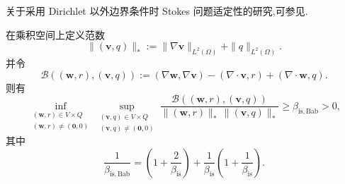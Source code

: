 \begin{note}[其他边界条件]\label{note:stokes-other-boundary-conditions}
关于采用 Dirichlet 以外边界条件时 Stokes 问题适定性的研究,可参见\textcite[第 4.1.4 节]{ErnGuermond2004}.
\end{note}

\begin{lemma}\label{lem:stokes-babuska-infsup}
在乘积空间上定义范数
\[
  \|(\bm{v},q)\|_*
    :=\|\nabla\bm{v}\|_{L^2(\Omega)}+\|q\|_{L^2(\Omega)}.
\]
并令
\[
  \mathcal{B}((\bm{w},r),(\bm{v},q))
    :=(\nabla\bm{w},\nabla\bm{v})
      -(\nabla\cdot\bm{v},r)
      +(\nabla\cdot\bm{w},q).
\]
则有
\begin{equation}\label{eq:stokes-babuska-infsup}
  \inf_{\substack{(\bm{w},r)\in V\times Q\\
                   (\bm{w},r)\ne(\bm{0},0)}}
   \sup_{\substack{(\bm{v},q)\in V\times Q\\
                    (\bm{v},q)\ne(\bm{0},0)}}
   \frac{\mathcal{B}((\bm{w},r),(\bm{v},q))}
        {\|(\bm{w},r)\|_*\,\|(\bm{v},q)\|_*}
   \geq\beta_{\mathrm{is,Bab}}>0,
\end{equation}
其中
\[
  \frac{1}{\beta_{\mathrm{is,Bab}}}
   =\left(1+\frac{2}{\beta_{\mathrm{is}}}\right)
     +\frac{1}{\beta_{\mathrm{is}}}
        \left(1+\frac{1}{\beta_{\mathrm{is}}}\right).
\]
\end{lemma}

